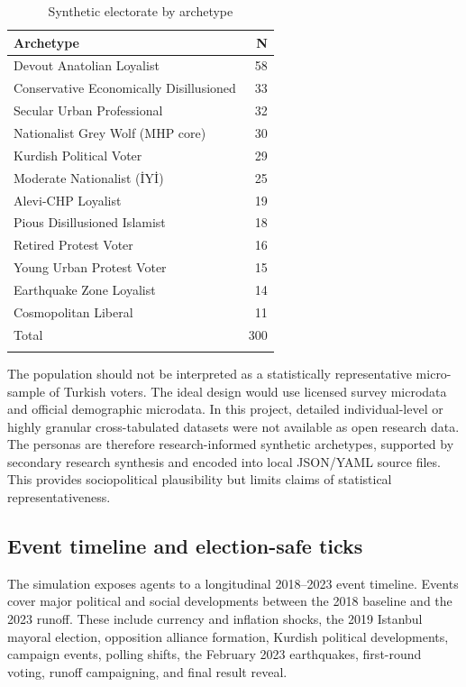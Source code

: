 \documentclass[pdflatex,sn-mathphys-num,iicol]{sn-jnl}
\begin{document}
\begin{table}[t]
\caption{Synthetic electorate by archetype}
\label{tab:archetypes}
\centering
\begin{tabular}{@{}p{}r@{}}
\toprule
Archetype & N \\
\midrule
Devout Anatolian Loyalist & 58 \\
Conservative Economically Disillusioned & 33 \\
Secular Urban Professional & 32 \\
Nationalist Grey Wolf (MHP core) & 30 \\
Kurdish Political Voter & 29 \\
Moderate Nationalist (İYİ) & 25 \\
Alevi-CHP Loyalist & 19 \\
Pious Disillusioned Islamist & 18 \\
Retired Protest Voter & 16 \\
Young Urban Protest Voter & 15 \\
Earthquake Zone Loyalist & 14 \\
Cosmopolitan Liberal & 11 \\
\midrule
Total & 300 \\
\botrule
\end{tabular}
\end{table}

The population should not be interpreted as a statistically representative micro-sample of Turkish voters. The ideal design would use licensed survey microdata and official demographic microdata. In this project, detailed individual-level or highly granular cross-tabulated datasets were not available as open research data. The personas are therefore research-informed synthetic archetypes, supported by secondary research synthesis and encoded into local JSON/YAML source files. This provides sociopolitical plausibility but limits claims of statistical representativeness.

\subsection{Event timeline and election-safe ticks}\label{subsec:timeline}

The simulation exposes agents to a longitudinal 2018--2023 event timeline. Events cover major political and social developments between the 2018 baseline and the 2023 runoff. These include currency and inflation shocks, the 2019 Istanbul mayoral election, opposition alliance formation, Kurdish political developments, campaign events, polling shifts, the February 2023 earthquakes, first-round voting, runoff campaigning, and final result reveal.
\end{document}
